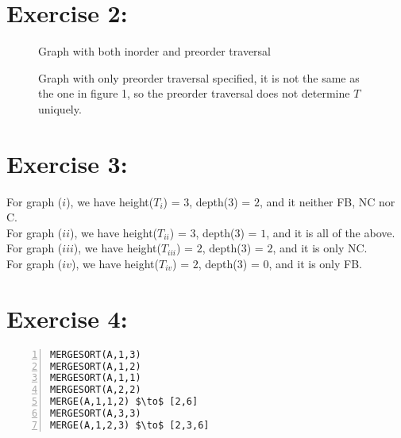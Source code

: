 \documentclass{article}
\begin{document}
\section*{Exercise 2:}

\begin{figure}[htpb]
    \centering
 \caption{Graph with both inorder and preorder traversal}
\end{figure}
\begin{figure}[htpb]
    \centering
{}
\caption{Graph with only preorder traversal specified, it is not the same as
the one in figure 1, so the preorder traversal does not determine $T$ uniquely.}
\end{figure}
\section*{Exercise 3:}
For graph ($i$), we have height($T_{i}$) = $3$, depth($3$) = $2$, and it neither
FB, NC nor C. \\
For graph ($ii$), we have height($T_{ii}$) = $3$, depth($3$) = $1$, and it is all of
the above.  \\
For graph ($iii$), we have height($T_{iii}$) = $2$, depth($3$) = $2$, and it is
only NC.  \\
For graph ($iv$), we have height($T_{iv}$) = $2$, depth($3$) = $0$, and it is only
FB. 
\section*{Exercise 4:}
\begin{lstlisting}[numbers = left]      
MERGESORT(A,1,3) 
MERGESORT(A,1,2) 
MERGESORT(A,1,1) 
MERGESORT(A,2,2) 
MERGE(A,1,1,2) $\to$ [2,6]
MERGESORT(A,3,3)
MERGE(A,1,2,3) $\to$ [2,3,6]
\end{lstlisting}
\end{document}
